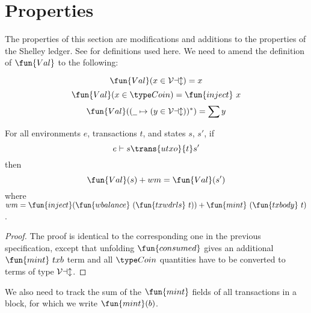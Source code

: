 \newcommand{\Val}{\fun{Val}}
\newcommand{\POV}[2]{\ensuremath{\mathsf{PresOfVal}(#1, \mathsf{#2})}}

\section{Properties}
\label{sec:properties}

The properties of this section are modifications and additions to the properties of the Shelley ledger. See \cite{shelley_spec} for definitions used here. We need to amend the definition of $\Val$ to the following:

\begin{equation*}
    \Val(x \in \ValClass) = x
\end{equation*}
\begin{equation*}
    \Val(x \in \Coin) = \fun{inject}~x
\end{equation*}
\begin{equation*}
    \Val((\wcard\mapsto (y \in \ValClass))^{*}) = \sum y
\end{equation*}

\begin{lemma}
  \label{lemma:utxo-pres-of-value}
  For all environments $e$, transactions $t$, and states $s$, $s'$, if
  \begin{equation*}
    e\vdash s\trans{utxo}{t}s'
  \end{equation*}
  then
  \begin{equation*}
    \Val(s) + wm = \Val(s')
  \end{equation*}
  where $wm = \fun{inject} (\fun{wbalance}~(\fun{txwdrls}~{t})) + \fun{mint}~(\fun{txbody}~{t})$.
\end{lemma}
\begin{proof}
  The proof is identical to the corresponding one in the previous
  specification, except that unfolding $\fun{consumed}$ gives an
  additional $\fun{mint}~{txb}$ term and all $\Coin$ quantities have
  to be converted to terms of type $\mathcal{Val}$.
\end{proof}

We also need to track the sum of the $\fun{mint}$ fields of all
transactions in a block, for which we write $\fun{mint}(b)$.

